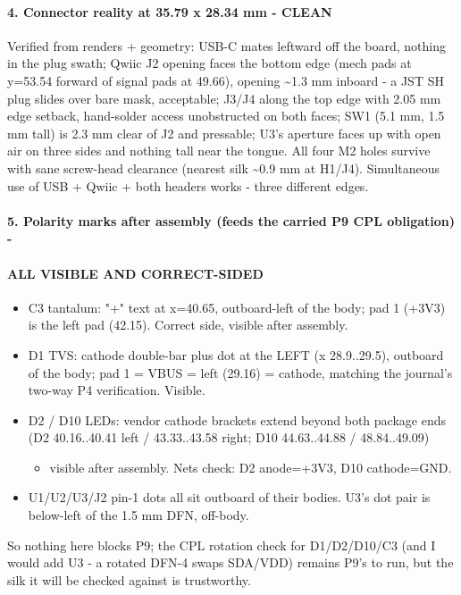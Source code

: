 \documentclass[11pt,a4paper]{article}
\begin{document}
\paragraph*{4. Connector reality at 35.79 x 28.34 mm - CLEAN}
Verified from renders + geometry: USB-C mates leftward off the board, nothing in the plug swath; Qwiic J2 opening faces the bottom edge (mech pads at y=53.54 forward of signal pads at 49.66), opening \textasciitilde{}1.3 mm inboard - a JST SH plug slides over bare mask, acceptable; J3/J4 along the top edge with 2.05 mm edge setback, hand-solder access unobstructed on both faces; SW1 (5.1 mm, 1.5 mm tall) is 2.3 mm clear of J2 and pressable; U3's aperture faces up with open air on three sides and nothing tall near the tongue. All four M2 holes survive with sane screw-head clearance (nearest silk \textasciitilde{}0.9 mm at H1/J4). Simultaneous use of USB + Qwiic + both headers works - three different edges.

\paragraph*{5. Polarity marks after assembly (feeds the carried P9 CPL obligation) -}
\paragraph*{ALL VISIBLE AND CORRECT-SIDED}
\begin{itemize}
\item C3 tantalum: "+" text at x=40.65, outboard-left of the body; pad 1 (+3V3)
is the left pad (42.15). Correct side, visible after assembly.
\item D1 TVS: cathode double-bar plus dot at the LEFT (x 28.9..29.5), outboard of
the body; pad 1 = VBUS = left (29.16) = cathode, matching the journal's
two-way P4 verification. Visible.
\item D2 / D10 LEDs: vendor cathode brackets extend beyond both package ends
(D2 40.16..40.41 left / 43.33..43.58 right; D10 44.63..44.88 / 48.84..49.09)
\begin{itemize}
\item visible after assembly. Nets check: D2 anode=+3V3, D10 cathode=GND.
\end{itemize}
\item U1/U2/U3/J2 pin-1 dots all sit outboard of their bodies. U3's dot pair is
below-left of the 1.5 mm DFN, off-body.
\end{itemize}
So nothing here blocks P9; the CPL rotation check for D1/D2/D10/C3 (and I would add U3 - a rotated DFN-4 swaps SDA/VDD) remains P9's to run, but the silk it will be checked against is trustworthy.
\end{document}
